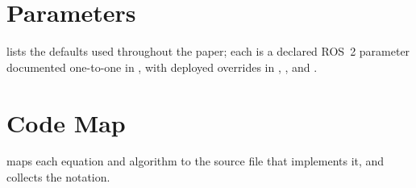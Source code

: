

\section{Parameters}\label{app:params}

 lists the defaults used throughout the paper; each is a declared ROS~2 parameter documented one-to-one in , with deployed overrides in , , and .



\section{Code Map}\label{app:codemap}

 maps each equation and algorithm to the source file that implements it, and  collects the notation.



